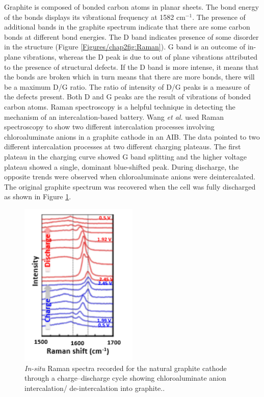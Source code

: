 Graphite is composed of  bonded carbon atoms in planar sheets. The bond energy of the  bonds displays its vibrational frequency at 1582 cm$^{-1}$. The presence of additional bands in the graphite spectrum indicate that there are some carbon bonds at different bond energies. The D band indicates presence of some disorder in the structure (Figure \ref{Figures/chap2fig:Raman}). G band is an outcome of in-plane vibrations, whereas the D peak is due to out of plane vibrations attributed to the presence of structural defects. If the D band is more intense, it means that the  bonds are broken which in turn means that there are more  bonds, there will be a maximum D/G ratio. The ratio of intensity of D/G peaks is a measure of the defects present. Both D and G peaks are the result of vibrations of  bonded carbon atoms.  
Raman spectroscopy is a helpful technique in detecting the mechanism of an intercalation-based battery. Wang \textit{et al.} used Raman spectroscopy to show two different intercalation processes involving chloroaluminate anions in a graphite cathode in an AIB. The data pointed to two different intercalation processes at two different charging plateaus. The first plateau in the charging curve showed G band splitting and the higher voltage plateau showed a single, dominant blue-shifted peak. During discharge, the opposite trends were observed when chloroaluminate anions were deintercalated. The original graphite spectrum was recovered when the cell was fully discharged\cite{wang_advanced_2017} as shown in Figure \ref{Figures/chap2fig:Raman2}. 

\begin{figure}[tbh!]
\centering
\includegraphics[width=0.5\textwidth]{Figures/chap2fig/Raman2}
\caption{\textit{In-situ} Raman spectra recorded for the natural graphite cathode through a charge–discharge cycle showing chloroaluminate anion intercalation/ de-intercalation into graphite.\cite{wang_advanced_2017}.}
\label{Figures/chap2fig:Raman2}
\end{figure}

